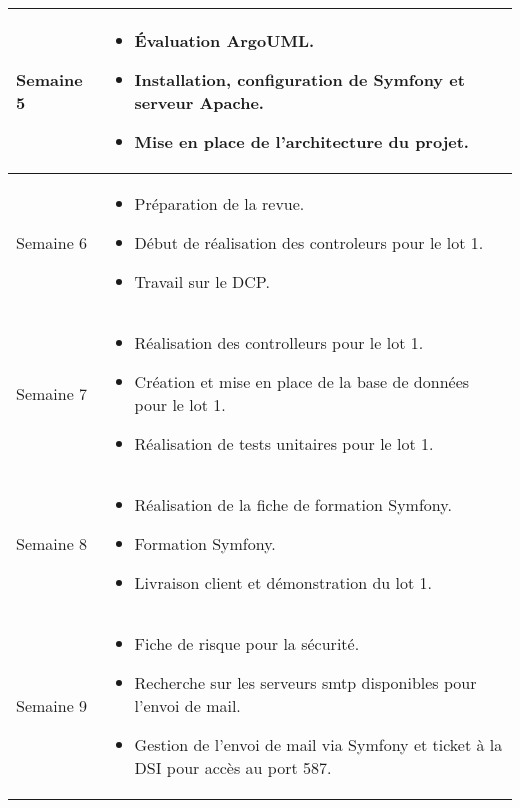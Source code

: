 \documentclass [a4paper] {article}
\begin{document}
\section*{\Florian}

\begin{tabularx}{16.8cm}{|>{\columncolor{gray!40}}l|X|}
	\hline
	Semaine 5 & \begin{itemize}
        \item Évaluation ArgoUML.
        \item Installation, configuration de Symfony et serveur Apache.
        \item Mise en place de l'architecture du projet.
        \end{itemize}\\  
	\hline
        Semaine 6 & \begin{itemize}
	\item Préparation de la revue.
	\item Début de réalisation des controleurs pour le lot 1.
        \item Travail sur le DCP.  
	\end{itemize} \\
	\hline
        Semaine 7 & \begin{itemize}
	\item Réalisation des controlleurs pour le lot 1.
        \item Création et mise en place de la base de données pour le lot 1.
	\item Réalisation de tests unitaires pour le lot 1.
	\end{itemize} \\
	\hline
        Semaine 8 & \begin{itemize}
	\item Réalisation de la fiche de formation Symfony.
        \item Formation Symfony.
        \item Livraison client et démonstration du lot 1.  
	\end{itemize} \\
	\hline
 	Semaine 9 & \begin{itemize}
	\item Fiche de risque pour la sécurité.
        \item Recherche sur les serveurs smtp disponibles pour l'envoi de mail.
        \item Gestion de l'envoi de mail via Symfony et ticket à la DSI pour accès au port 587.
	\end{itemize} \\

\end{tabularx}
\end{document}
